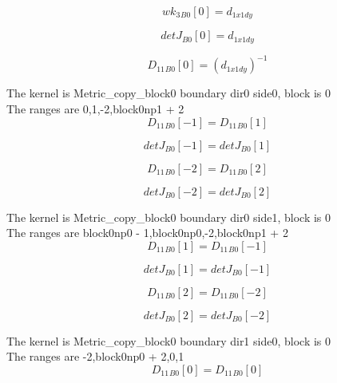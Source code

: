 \documentclass{article}
\begin{document}
\begin{dmath}{wk_{3}{_{B0}}}[{0}] = d_{1 x1 dy}\end{dmath}

\begin{dmath}{detJ{_{B0}}}[{0}] = d_{1 x1 dy}\end{dmath}

\begin{dmath}{D_{11}{_{B0}}}[{0}] = \left(d_{1 x1 dy} \right)^{-1}\end{dmath}

\noindent The kernel is Metric_copy_block0 boundary dir0 side0, block is 0\\\noindent The ranges are 0,1,-2,block0np1 + 2\\\begin{dmath}{D_{11}{_{B0}}}[{-1}] = {D_{11}{_{B0}}}[{1}]\end{dmath}

\begin{dmath}{detJ{_{B0}}}[{-1}] = {detJ{_{B0}}}[{1}]\end{dmath}

\begin{dmath}{D_{11}{_{B0}}}[{-2}] = {D_{11}{_{B0}}}[{2}]\end{dmath}

\begin{dmath}{detJ{_{B0}}}[{-2}] = {detJ{_{B0}}}[{2}]\end{dmath}

\noindent The kernel is Metric_copy_block0 boundary dir0 side1, block is 0\\\noindent The ranges are block0np0 - 1,block0np0,-2,block0np1 + 2\\\begin{dmath}{D_{11}{_{B0}}}[{1}] = {D_{11}{_{B0}}}[{-1}]\end{dmath}

\begin{dmath}{detJ{_{B0}}}[{1}] = {detJ{_{B0}}}[{-1}]\end{dmath}

\begin{dmath}{D_{11}{_{B0}}}[{2}] = {D_{11}{_{B0}}}[{-2}]\end{dmath}

\begin{dmath}{detJ{_{B0}}}[{2}] = {detJ{_{B0}}}[{-2}]\end{dmath}

\noindent The kernel is Metric_copy_block0 boundary dir1 side0, block is 0\\\noindent The ranges are -2,block0np0 + 2,0,1\\\begin{dmath}{D_{11}{_{B0}}}[{0}] = {D_{11}{_{B0}}}[{0}]\end{dmath}
\end{document}
